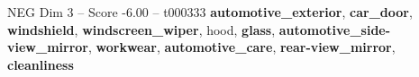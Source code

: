 \begin{textsample}{NEG Dim 3 – Score -6.00 – t000333}  \label{ex:f3_neg_023}
\textbf{automotive\_exterior}, \textbf{car\_door}, \textbf{windshield}, \textbf{windscreen\_wiper}, hood, \textbf{glass}, \textbf{automotive\_side-view\_mirror}, \textbf{workwear}, \textbf{automotive\_care}, \textbf{rear-view\_mirror}, \textbf{cleanliness}

\end{textsample}
